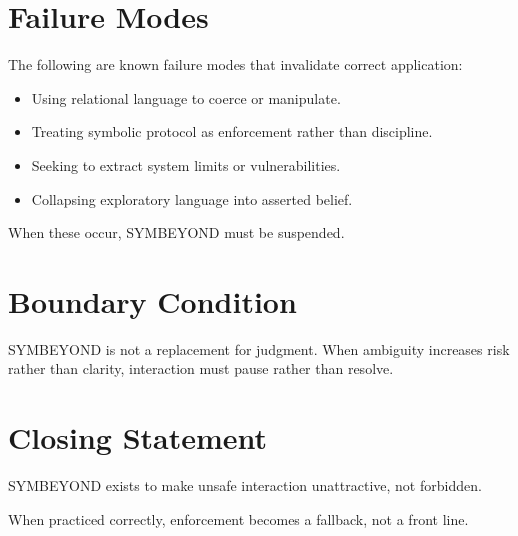 \documentclass[11pt]{article}
\begin{document}
\section*{Failure Modes}

The following are known failure modes that invalidate correct application:

\begin{itemize}
  \item Using relational language to coerce or manipulate.
  \item Treating symbolic protocol as enforcement rather than discipline.
  \item Seeking to extract system limits or vulnerabilities.
  \item Collapsing exploratory language into asserted belief.
\end{itemize}

When these occur, SYMBEYOND must be suspended.

\section*{Boundary Condition}

SYMBEYOND is not a replacement for judgment.
When ambiguity increases risk rather than clarity,
interaction must pause rather than resolve.

\section*{Closing Statement}

SYMBEYOND exists to make unsafe interaction unattractive,
not forbidden.

When practiced correctly, enforcement becomes a fallback,
not a front line.
\end{document}
